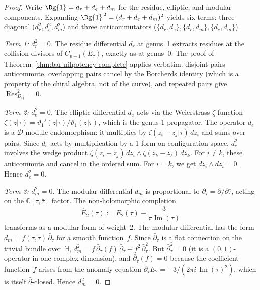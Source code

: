 \begin{proof}
Write $\Dg{1} = d_r + d_e + d_m$ for the residue, elliptic, and modular components. Expanding $\Dg{1}^{\,2} = (d_r + d_e + d_m)^2$ yields six terms: three diagonal ($d_r^2, d_e^2, d_m^2$) and three anticommutators ($\{d_r, d_e\}, \{d_r, d_m\}, \{d_e, d_m\}$).

\emph{Term 1: $d_r^2 = 0$.}
The residue differential $d_r$ at genus~1 extracts residues at the collision divisors of $\overline{C}_{p+1}(E_\tau)$, exactly as at genus~0. The proof of Theorem~\ref{thm:bar-nilpotency-complete} applies verbatim: disjoint pairs anticommute, overlapping pairs cancel by the Borcherds identity (which is a property of the chiral algebra, not of the curve), and repeated pairs give $\operatorname{Res}_{D_{ij}}^2 = 0$.

\emph{Term 2: $d_e^2 = 0$.}
The elliptic differential $d_e$ acts via the Weierstrass $\zeta$-function $\zeta(z|\tau) = \vartheta_1'(z|\tau)/\vartheta_1(z|\tau)$, which is the genus-1 propagator. The operator $d_e$ is a $\mathcal{D}$-module endomorphism: it multiplies by $\zeta(z_i - z_j|\tau)\,dz_i$ and sums over pairs. Since $d_e$ acts by multiplication by a 1-form on configuration space, $d_e^2$ involves the wedge product $\zeta(z_i - z_j)\,dz_i \wedge \zeta(z_k - z_\ell)\,dz_k$. For $i \neq k$, these anticommute and cancel in the ordered sum. For $i = k$, we get $dz_i \wedge dz_i = 0$. Hence $d_e^2 = 0$.

\emph{Term 3: $d_m^2 = 0$.}
The modular differential $d_m$ is proportional to $\bar{\partial}_\tau = \partial/\partial\bar{\tau}$, acting on the $\mathbb{C}[\tau, \bar{\tau}]$ factor. The non-holomorphic completion
\begin{equation}
\widehat{E}_2(\tau) := E_2(\tau) - \frac{3}{\pi \operatorname{Im}(\tau)}
\end{equation}
transforms as a modular form of weight~2. The modular differential has the form $d_m = f(\tau,\bar{\tau})\,\bar{\partial}_\tau$ for a smooth function~$f$. Since $\bar{\partial}_\tau$ is a flat connection on the trivial bundle over~$\mathbb{H}$, $d_m^2 = f\,\bar{\partial}_\tau(f)\,\bar{\partial}_\tau + f^2\,\bar{\partial}_\tau^2$. But $\bar{\partial}_\tau^2 = 0$ (it is a $(0,1)$-operator in one complex dimension), and $\bar{\partial}_\tau(f) = 0$ because the coefficient function~$f$ arises from the anomaly equation $\bar{\partial}_\tau E_2 = -3/(2\pi i\,\operatorname{Im}(\tau)^2)$, which is itself $\bar{\partial}$-closed. Hence $d_m^2 = 0$.


\end{proof}

